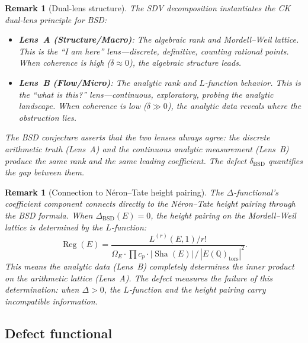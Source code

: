 \documentclass[11pt]{article}
\newtheorem{remark}[theorem]{Remark}
\DeclareMathOperator{\Reg}{Reg}
\DeclareMathOperator{\Sha}{Sha}
\begin{document}
\begin{remark}[Dual-lens structure]
The SDV decomposition instantiates the CK dual-lens principle for BSD:
\begin{itemize}
  \item \textbf{Lens~A (Structure/Macro)}: The algebraic rank and
    Mordell--Weil lattice.  This is the ``I am here'' lens---discrete,
    definitive, counting rational points.  When coherence is high
    ($\delta \approx 0$), the algebraic structure leads.
  \item \textbf{Lens~B (Flow/Micro)}: The analytic rank and $L$-function
    behavior.  This is the ``what is this?'' lens---continuous, exploratory,
    probing the analytic landscape.  When coherence is low ($\delta \gg 0$),
    the analytic data reveals where the obstruction lies.
\end{itemize}
The BSD conjecture asserts that the two lenses always agree: the discrete
arithmetic truth (Lens~A) and the continuous analytic measurement (Lens~B)
produce the same rank and the same leading coefficient.  The defect
$\delta_{\mathrm{BSD}}$ quantifies the gap between them.
\end{remark}

\begin{remark}[Connection to N\'eron--Tate height pairing]
The $\Delta$-functional's coefficient component connects directly to the
N\'eron--Tate height pairing through the BSD formula.  When
$\Delta_{\mathrm{BSD}}(E) = 0$, the height pairing on the Mordell--Weil
lattice is \emph{determined} by the $L$-function:
\[
  \Reg(E) = \frac{L^{(r)}(E,1)/r!}{\Omega_E \cdot \prod c_p \cdot
    |\Sha(E)| \,/\, |E(\mathbb{Q})_{\mathrm{tors}}|^2}.
\]
This means the analytic data (Lens~B) completely determines the inner product
on the arithmetic lattice (Lens~A).  The defect measures the failure of this
determination: when $\Delta > 0$, the $L$-function and the height pairing
carry incompatible information.
\end{remark}

\subsection{Defect functional}
\end{document}
